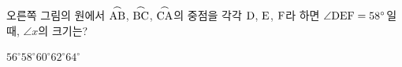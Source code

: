 \noindent\begin{minipage}[t]{0.58\linewidth}\vspace{0pt}\raggedright 오른쪽 그림의 원에서 $\overset{\frown}{\mathrm{AB}}$, $\overset{\frown}{\mathrm{BC}}$, $\overset{\frown}{\mathrm{CA}}$의 중점을 각각 $\mathrm{D}$, $\mathrm{E}$, $\mathrm{F}$라 하면 $\angle\mathrm{DEF}=58^\circ$일 때, $\angle x$의 크기는?\end{minipage}\hfill\begin{minipage}[t]{0.4\linewidth}\vspace{0pt}\centering \resizebox{\ifdim\width>\linewidth\linewidth\else\width\fi}{!}{}\end{minipage}\par
\begin{choicesii}{$56^\circ$}{$58^\circ$}{$60^\circ$}{$62^\circ$}{$64^\circ$}\end{choicesii}
